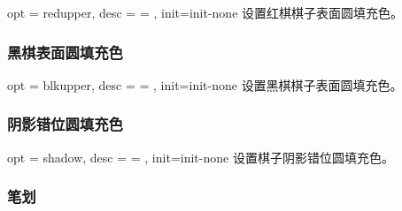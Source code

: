 \documentclass[full]{l3doc}
\begin{document}
\begin{documentation}
\begin{option}{ opt = redupper, desc = {= }, init=init-none }
  设置红棋棋子表面圆填充色。
\end{option}

\begin{SideBySideExample}[frame=single,numbers=left,
                xrightmargin=.60\linewidth,gobble=2]
  \centering
  \cchessboard[redupper=red,
             redpiece=white]
\end{SideBySideExample}

\bigskip

\subsubsection{黑棋表面圆填充色}

\begin{option}{ opt = blkupper, desc = {= }, init=init-none }
  设置黑棋棋子表面圆填充色。
\end{option}

\begin{SideBySideExample}[frame=single,numbers=left,
                xrightmargin=.60\linewidth,gobble=2]
  \centering
  \cchessboard[blkupper=black,
               blkpiece=white]
\end{SideBySideExample}

\bigskip

\subsubsection{阴影错位圆填充色}

\begin{option}{ opt = shadow, desc = {= }, init=init-none }
  设置棋子阴影错位圆填充色。
\end{option}

\begin{SideBySideExample}[frame=single,numbers=left,
                xrightmargin=.60\linewidth,gobble=2]
  \centering
  \cchessboard[shadow=red!80]
\end{SideBySideExample}

\bigskip

\subsubsection{笔划}


\end{documentation}
\end{document}
